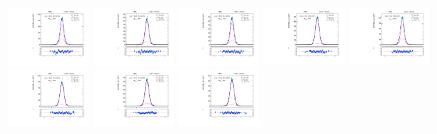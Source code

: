 \begin{figure}[htb]
\includegraphics[width=0.19\textwidth]{plots/Appendix_Recoil_Fits/ZmmMC_PF_13TeV_2G/pfu2fit_24.pdf}
\includegraphics[width=0.19\textwidth]{plots/Appendix_Recoil_Fits/ZmmMC_PF_13TeV_2G/pfu2fit_25.pdf}
\includegraphics[width=0.19\textwidth]{plots/Appendix_Recoil_Fits/ZmmMC_PF_13TeV_2G/pfu2fit_26.pdf}
\includegraphics[width=0.19\textwidth]{plots/Appendix_Recoil_Fits/ZmmMC_PF_13TeV_2G/pfu2fit_27.pdf}
\includegraphics[width=0.19\textwidth]{plots/Appendix_Recoil_Fits/ZmmMC_PF_13TeV_2G/pfu2fit_28.pdf}
\includegraphics[width=0.19\textwidth]{plots/Appendix_Recoil_Fits/ZmmMC_PF_13TeV_2G/pfu2fit_29.pdf}
\includegraphics[width=0.19\textwidth]{plots/Appendix_Recoil_Fits/ZmmMC_PF_13TeV_2G/pfu2fit_30.pdf}
\includegraphics[width=0.19\textwidth]{plots/Appendix_Recoil_Fits/ZmmMC_PF_13TeV_2G/pfu2fit_31.pdf}

\end{figure}
